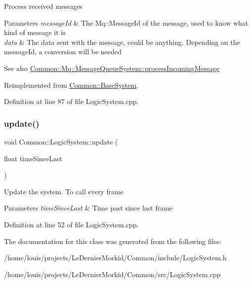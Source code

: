 Process received messages 
\begin{DoxyParams}{Parameters}
{\em message\+Id} & The Mq\+::\+Message\+Id of the message, used to know what kind of message it is \\
\hline
{\em data} & The data sent with the message, could be anything. Depending on the message\+Id, a conversion will be needed \\
\hline
\end{DoxyParams}
\begin{DoxySeeAlso}{See also}
\hyperlink{class_common_1_1_mq_1_1_message_queue_system_ad6eb849b72f03e3e4f09c6457c8ecda6}{Common\+::\+Mq\+::\+Message\+Queue\+System\+::process\+Incoming\+Message} 
\end{DoxySeeAlso}


Reimplemented from \hyperlink{class_common_1_1_base_system_a6820dfed1ee63f376e5773b361e3d2a8}{Common\+::\+Base\+System}.



Definition at line 87 of file Logic\+System.\+cpp.

\mbox{\label{class_common_1_1_logic_system_a8f11d71f1f95adbb95dcb6c4281d699a}} 
\subsubsection{\texorpdfstring{update()}{update()}}
{\footnotesize\ttfamily void Common\+::\+Logic\+System\+::update (\begin{DoxyParamCaption}\item[{float}]{time\+Since\+Last }\end{DoxyParamCaption})}

Update the system. To call every frame 
\begin{DoxyParams}{Parameters}
{\em time\+Since\+Last} & Time past since last frame \\
\hline
\end{DoxyParams}


Definition at line 52 of file Logic\+System.\+cpp.



The documentation for this class was generated from the following files\+:\begin{DoxyCompactItemize}
\item 
/home/louis/projects/\+Le\+Dernier\+Morkid/\+Common/include/Logic\+System.\+h\item 
/home/louis/projects/\+Le\+Dernier\+Morkid/\+Common/src/Logic\+System.\+cpp\end{DoxyCompactItemize}
